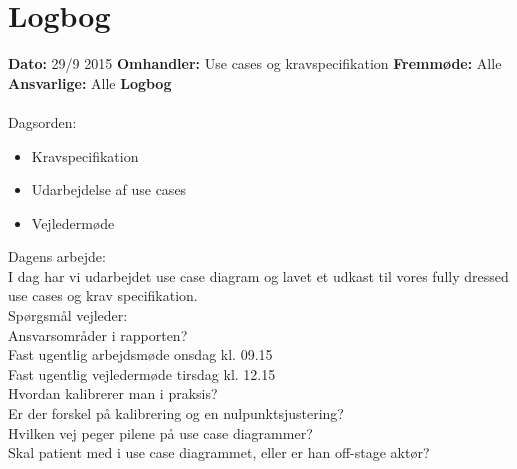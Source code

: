 \chapter{Logbog}

\textbf{Dato:} 29/9 2015 
\textbf{Omhandler:} Use cases og kravspecifikation
\textbf{Fremmøde:} Alle
\textbf{Ansvarlige:} Alle
\textbf{Logbog}
\\
\\
Dagsorden:
\begin{itemize}
	\item Kravspecifikation
	\item Udarbejdelse af use cases
	\item Vejledermøde
\end{itemize}

Dagens arbejde: \\
I dag har vi udarbejdet use case diagram og lavet et udkast til vores fully dressed use cases og krav specifikation.\\


Spørgsmål vejleder: \\
Ansvarsområder i rapporten?\\
Fast ugentlig arbejdsmøde onsdag kl. 09.15\\
Fast ugentlig vejledermøde tirsdag kl. 12.15\\
Hvordan kalibrerer man i praksis?\\
Er der forskel på kalibrering og en nulpunktsjustering?\\
Hvilken vej peger pilene på use case diagrammer?\\
Skal patient med i use case diagrammet, eller er han off-stage aktør?\\

